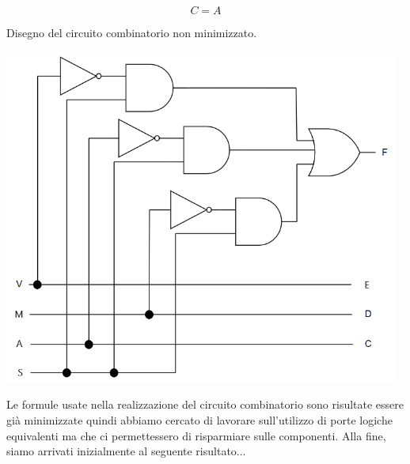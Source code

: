 \begin{questions}
\begin{solution}
\begin{enumerate}
	                    \begin{center}
	                    	\begin{karnaugh-map}[4][4][1][$VS$][$AM$]
	                    	\end{karnaugh-map}
	                    \end{center}
	                    \[ C = A \]
                    
                    
            \end{enumerate}
            
            Disegno del circuito combinatorio non minimizzato.

            \begin{center}
                \includegraphics[width=13cm, keepaspectratio]{img/circuito.png}
            \end{center}
            
            \newpage
            
            Le formule usate nella realizzazione del circuito combinatorio sono risultate essere già minimizzate quindi abbiamo cercato di lavorare sull'utilizzo di porte logiche equivalenti ma che ci permettessero di risparmiare sulle componenti. Alla fine, siamo arrivati inizialmente al seguente risultato...
            

\end{solution}
\end{questions}
